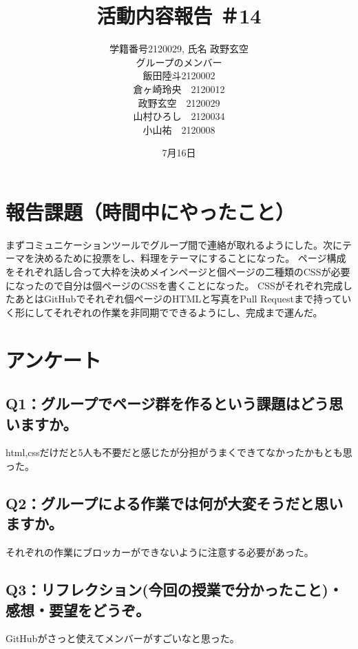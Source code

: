 \documentclass[12pt,a4j]{jarticle}
\begin{document}
\title{活動内容報告 ＃14}
\author{学籍番号2120029, 氏名 政野玄空\\
グループのメンバー\\
飯田陸斗2120002\\
倉ヶ崎玲央　2120012\\
政野玄空　2120029\\
山村ひろし　2120034\\
小山祐　2120008\\
}
\date{7月16日}
\maketitle

\section{報告課題（時間中にやったこと）}
まずコミュニケーションツールでグループ間で連絡が取れるようにした。次にテーマを決めるために投票をし、料理をテーマにすることになった。
ページ構成をそれぞれ話し合って大枠を決めメインページと個ページの二種類のCSSが必要になったので自分は個ページのCSSを書くことになった。
CSSがそれぞれ完成したあとはGitHubでそれぞれ個ページのHTMLと写真をPull Requestまで持っていく形にしてそれぞれの作業を非同期でできるようにし、完成まで運んだ。


\section{アンケート}

\subsection{Q1：グループでページ群を作るという課題はどう思いますか。}
html,cssだけだと5人も不要だと感じたが分担がうまくできてなかったかもとも思った。

\subsection{Q2：グループによる作業では何が大変そうだと思いますか。}
それぞれの作業にブロッカーができないように注意する必要があった。

\subsection{Q3：リフレクション(今回の授業で分かったこと)・感想・要望をどうぞ。}
GitHubがさっと使えてメンバーがすごいなと思った。
\end{document}
